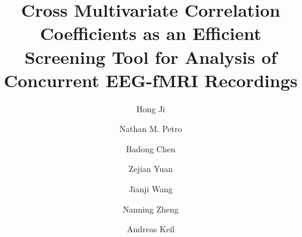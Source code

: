 \newcommand{\lstsetcpp}
{
	\lstset{frame = tb,
		framerule = 0.25pt,
		float,
		fontadjust,
		backgroundcolor={\color{listlightgray}},
		basicstyle = {\ttfamily\scriptsize},
		keywordstyle = {\ttfamily\color{listkeyword}\textbf},
		identifierstyle = {\ttfamily},
		commentstyle = {\ttfamily\color{listcomment}\textit},
		stringstyle = {\ttfamily},
		showstringspaces = false,
		showtabs = false,
		numbers = none,
		numbersep = 6pt,
		numberstyle={\ttfamily\color{listnumbers}},
		tabsize = 2,
		language=[ANSI]C++,
		floatplacement=!h,
		caption={},
		captionpos=b,
	}
}
\modulolinenumbers[5]  %

	\pagestyle{empty}
	\begin{frontmatter}
		
		\title{Cross Multivariate Correlation Coefficients as an Efficient Screening Tool for Analysis of Concurrent EEG-fMRI Recordings}
		
		\author[mymainaddress]{Hong Ji}
		\author[mysecondaryaddress]{Nathan M. Petro}
		\author[mymainaddress]{Badong Chen}
		
		\author[mymainaddress]{Zejian Yuan}
		\author[mymainaddress]{Jianji Wang}
		\author[mymainaddress]{Nanning Zheng}
		\author[mysecondaryaddress]{Andreas Keil}
		
		\address[mymainaddress]{Institute of Artificial Intelligence and Robotics, Xiᯡn Jiaotong Univeristy, P.O. Box 1171, 28 Xianning West Road, Xi'an 710049}
		\address[mysecondaryaddress]{Center for the Study of Emotion and Attention, University of Florida, P.O. Box 112766, Gainesville, FL 32611-2250}
		
		
		
		

\end{frontmatter}
